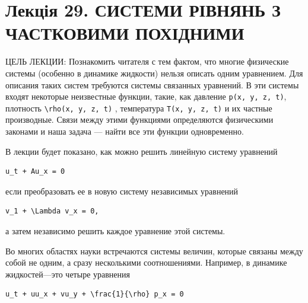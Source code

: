 \documentclass[
  ukrainian,
]{article}
\begin{document}
\section{Лекція 29. СИСТЕМИ РІВНЯНЬ З ЧАСТКОВИМИ
ПОХІДНИМИ}\label{ux43bux435ux43aux446ux456ux44f-29.-ux441ux438ux441ux442ux435ux43cux438-ux440ux456ux432ux43dux44fux43dux44c-ux437-ux447ux430ux441ux442ux43aux43eux432ux438ux43cux438-ux43fux43eux445ux456ux434ux43dux438ux43cux438}

ЦЕЛЬ ЛЕКЦИИ: Познакомить читателя с тем фактом, что многие физические
системы (особенно в динамике жидкости) нельзя описать одним уравнением.
Для описания таких систем требуются системы связанных уравнений. В эти
системы входят некоторые неизвестные функции, такие, как давление
\texttt{p(x,\ y,\ z,\ t)}, плотность
\texttt{\textbackslash{}rho(x,\ y,\ z,\ t)} , температура
\texttt{T(x,\ y,\ z,\ t)} и их частные производные. Связи между этими
функциями определяются физическими законами и наша задача --- найти все
эти функции одновременно.

В лекции будет показано, как можно решить линейную систему уравнений

\begin{verbatim}
u_t + Au_x = 0
\end{verbatim}

если преобразовать ее в новую систему независимых уравнений

\begin{verbatim}
v_1 + \Lambda v_x = 0,
\end{verbatim}

а затем независимо решить каждое уравнение этой системы.

Во многих областях науки встречаются системы величин, которые связаны
между собой не одним, а сразу несколькими соотношениями. Например, в
динамике жидкостей---это четыре уравнения

\begin{verbatim}
u_t + uu_x + vu_y + \frac{1}{\rho} p_x = 0
\end{verbatim}
\end{document}
